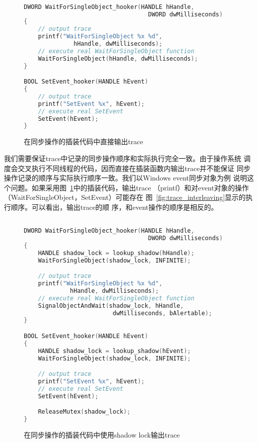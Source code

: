 \begin{figure}
\centering
\begin{lstlisting}[language=C++]

DWORD WaitForSingleObject_hooker(HANDLE hHandle,
                                   DWORD dwMilliseconds)
{
    // output trace
    printf("WaitForSingleObject %x %d",
              hHandle, dwMilliseconds);
    // execute real WaitForSingleObject function
    WaitForSingleObject(hHandle, dwMilliseconds);
}

BOOL SetEvent_hooker(HANDLE hEvent)
{
    // output trace
    printf("SetEvent %x", hEvent);
    // execute real SetEvent
    SetEvent(hEvent);
}
\end{lstlisting}
\caption{在同步操作的插装代码中直接输出trace}
\label{fig:trace_direct}
\end{figure}

我们需要保证trace中记录的同步操作顺序和实际执行完全一致。由于操作系统
调度会交叉执行不同线程的代码，因而直接在插装函数内输出trace并不能保证
同步操作记录的顺序与实际执行顺序一致。我们以Windows event同步对象为例
说明这个问题。如果采用图~\ref{fig:trace_direct}中的插装代码，输出trace
（printf）和对event对象的操作（WaitForSingleObject，SetEvent）可能存在
图~\ref{fig:trace_interleaving}显示的执行顺序。可以看出，输出trace的顺
序，和event操作的顺序是相反的。

\begin{figure}
\centering
\begin{lstlisting}[language=C++]

DWORD WaitForSingleObject_hooker(HANDLE hHandle, 
                                   DWORD dwMilliseconds)
{
    HANDLE shadow_lock = lookup_shadow(hHandle);
    WaitForSingleObject(shadow_lock, INFINITE);

    // output trace
    printf("WaitForSingleObject %x %d", 
             hHandle, dwMilliseconds);
    // execute real WaitForSingleObject function
    SignalObjectAndWait(shadow_lock, hHandle, 
                         dwMilliseconds, bAlertable);
}

BOOL SetEvent_hooker(HANDLE hEvent)
{
    HANDLE shadow_lock = lookup_shadow(hEvent);
    WaitForSingleObject(shadow_lock, INFINITE);

    // output trace
    printf("SetEvent %x", hEvent);
    // execute real SetEvent
    SetEvent(hEvent);

    ReleaseMutex(shadow_lock);
}

\end{lstlisting}
\caption{在同步操作的插装代码中使用shadow lock输出trace}
\label{fig:trace_shadowlock}
\end{figure}

